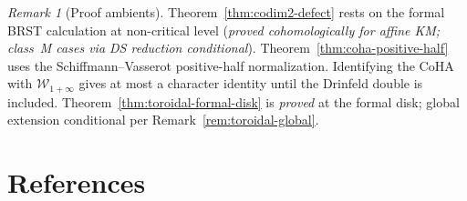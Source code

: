 \documentclass[11pt]{article}
\theoremstyle{plain}
\theoremstyle{definition}
\theoremstyle{remark}
\newtheorem{remark}[theorem]{Remark}
\newcommand{\cW}{\mathcal{W}}
\begin{document}
\begin{remark}[Proof ambients]
\label{rem:6d-proof-ambients}
Theorem~\ref{thm:codim2-defect} rests on the formal BRST calculation
at non-critical level (\emph{proved cohomologically for affine KM;
class~M cases via DS reduction conditional}). Theorem~\ref{thm:coha-positive-half}
uses the Schiffmann--Vasserot positive-half normalization. Identifying
the CoHA with $\cW_{1+\infty}$ gives at most a character identity
until the Drinfeld double is included.
Theorem~\ref{thm:toroidal-formal-disk} is \emph{proved}
at the formal disk; global extension conditional per
Remark~\ref{rem:toroidal-global}.
\end{remark}



\section*{References}
\end{document}
